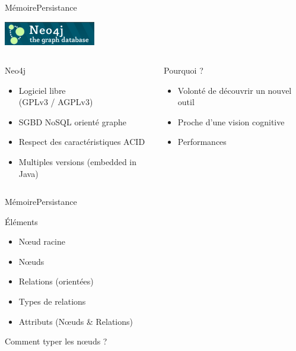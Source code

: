 \begin{frame}{Mémoire}{Persistance}
\begin{center}
\includegraphics[width=0.3\textwidth]{img/neo4j/neo4j_logo}
\end{center}
\begin{columns}[t]
	\begin{column}{0.5\textwidth}
		\begin{block}{Neo4j}
			\begin{itemize}
			\item Logiciel libre\\(GPLv3 / AGPLv3)
			\item SGBD NoSQL orienté graphe
			\item Respect des caractéristiques ACID
			\item Multiples versions (embedded in Java)
			\end{itemize}
		\end{block}
	\end{column}
    \begin{column}{0.5\textwidth}
	    \pause
		\begin{block}{Pourquoi ?}
			\begin{itemize}
			\item Volonté de découvrir un nouvel outil
			\item Proche d'une vision cognitive
			\item Performances
			\end{itemize}
		\end{block}
	\end{column}
\end{columns}
\end{frame}

\begin{frame}{Mémoire}{Persistance}
\begin{block}{Éléments}
\begin{itemize}
\item Nœud racine
\item Nœuds
\item Relations (orientées)
\item Types de relations
\item Attributs (Nœuds \& Relations)
\end{itemize}
\end{block}
\begin{block}{Comment typer les nœuds ?}
\begin{enumerate}
\end{enumerate}
\end{block}

\end{frame}

